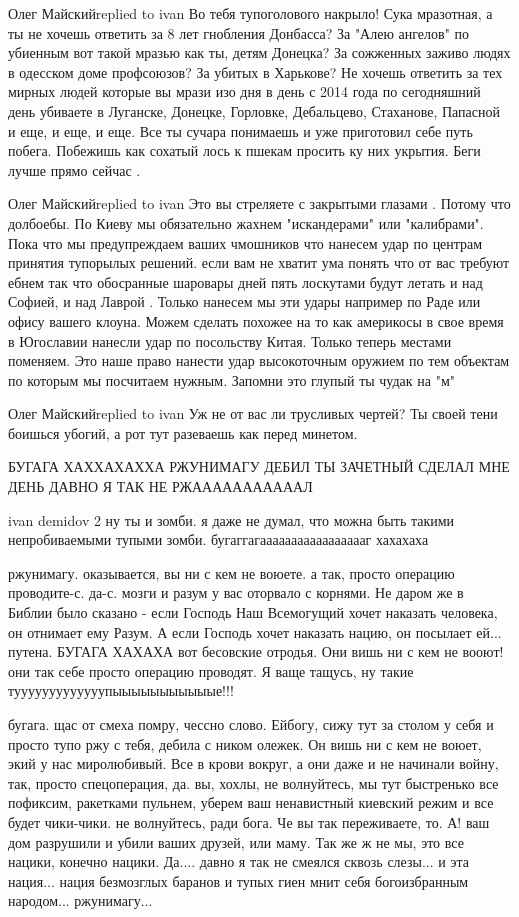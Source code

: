 Олег Майскийreplied to ivan Во тебя тупоголового накрыло! Сука мразотная, а ты
не хочешь ответить за 8 лет гнобления Донбасса? За "Алею ангелов" по убиенным
вот такой мразью как ты, детям Донецка? За сожженных заживо людях в одесском
доме профсоюзов? За убитых в Харькове? Не хочешь ответить за тех мирных людей
которые вы мрази изо дня в день с 2014 года по сегодняшний день убиваете в
Луганске, Донецке, Горловке, Дебальцево, Стаханове, Папасной и еще, и еще, и
еще. Все ты сучара понимаешь и уже приготовил себе путь побега. Побежишь как
сохатый лось к пшекам просить ку них укрытия. Беги лучше прямо сейчас .

Олег Майскийreplied to ivan Это вы стреляете с закрытыми глазами . Потому что
долбоебы. По Киеву мы обязательно жахнем "искандерами" или "калибрами". Пока
что мы предупреждаем ваших чмошников что нанесем удар по центрам принятия
тупорылых решений. если вам не хватит ума понять что от вас требуют ебнем так
что обосранные шаровары дней пять лоскутами будут летать и над Софией, и над
Лаврой . Только нанесем мы эти удары например по Раде или офису вашего клоуна.
Можем сделать похожее на то как америкосы в свое время в Югославии нанесли удар
по посольству Китая. Только теперь местами поменяем. Это наше право нанести
удар высокоточным оружием по тем объектам по которым мы посчитаем нужным.
Запомни это глупый ты чудак на "м"

Олег Майскийreplied to ivan
Уж не от вас ли трусливых чертей? Ты своей тени боишься убогий, а рот тут разеваешь как перед минетом.

БУГАГА ХАХХАХАХХА РЖУНИМАГУ ДЕБИЛ ТЫ ЗАЧЕТНЫЙ СДЕЛАЛ МНЕ ДЕНЬ ДАВНО Я ТАК НЕ
РЖАААААААААААЛ

ivan demidov 2 ну ты и зомби. я даже не думал, что можна быть такими
непробиваемыми тупыми зомби. бугаггагаааааааааааааааааг хахахаха

ржунимагу. оказывается, вы ни с кем не воюете. а так, просто операцию
проводите-с. да-с. мозги и разум у вас оторвало с корнями. Не даром же в Библии
было сказано - если Господь Наш Всемогущий хочет наказать человека, он отнимает
ему Разум. А если Господь хочет наказать нацию, он посылает ей... путена.
БУГАГА ХАХАХА вот бесовские отродья. Они вишь ни с кем не вооют! они так себе
просто операцию проводят. Я ваще тащусь, ну такие
тууууууууууууупыыыыыыыыыыые!!!

бугага. щас от смеха помру, чессно слово. Ейбогу, сижу тут за столом у себя и
просто тупо ржу с тебя, дебила с ником олежек. Он вишь ни с кем не воюет, экий
у нас миролюбивый. Все в крови вокруг, а они даже и не начинали войну, так,
просто спецоперация, да. вы, хохлы, не волнуйтесь, мы тут быстренько все
пофиксим, ракетками пульнем, уберем ваш ненавистный киевский режим и все будет
чики-чики. не волнуйтесь, ради бога. Че вы так переживаете, то. А! ваш дом
разрушили и убили ваших друзей, или маму. Так же ж не мы, это все нацики,
конечно нацики. Да.... давно я так не смеялся сквозь слезы... и эта нация...
нация безмозглых баранов и тупых гиен мнит себя богоизбранным народом...
ржунимагу...

